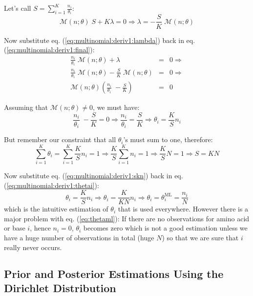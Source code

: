 Let's call $S = \sum_{i=1}^K \frac{n_i}{\theta_i}$:
\begin{equation}
\mathcal{M}(n ; \theta) \; S + K \lambda = 0 
\Rightarrow
\lambda = - \frac{S}{K} \; \mathcal{M}(n ; \theta)
\label{eq:multinomial:deriv1:lambda}
\end{equation}

Now substitute eq. (\ref{eq:multinomial:deriv1:lambda}) back in eq. (\ref{eq:multinomial:deriv1:final}):
\begin{eqnarray}
\frac{n_i}{\theta_i} \; \mathcal{M}(n ; \theta) + \lambda & = & 0
\Rightarrow \\
\frac{n_i}{\theta_i} \; \mathcal{M}(n ; \theta)
- \frac{S}{K} \; \mathcal{M}(n ; \theta)
& = & 0
\Rightarrow \\
\mathcal{M}(n ; \theta) \left(
\frac{n_i}{\theta_i} \; 
- \frac{S}{K} \right)
& = & 0
\label{eq:multinomial:deriv1:backtoi}
\end{eqnarray}

Assuming that $\mathcal{M}(n ; \theta) \ne 0$, we must have:
\begin{equation}
\frac{n_i}{\theta_i} \; - \frac{S}{K} = 0
\Rightarrow
\frac{n_i}{\theta_i} = \frac{S}{K}
\Rightarrow
\theta_i = \frac{K}{S} n_i
\label{eq:multinomial:deriv1:thetai}
\end{equation}

But remember our constraint that all $\theta_i$'s must sum to one, therefore:
\begin{equation}
\sum_{i=1}^K \theta_i = \sum_{i=1}^K \frac{K}{S} n_i = 1
\Rightarrow
\frac{K}{S} \sum_{i=1}^K n_i = 1
\Rightarrow
\frac{K}{S} N = 1
\Rightarrow
S = K N
\label{eq:multinomial:deriv1:skn}
\end{equation}

Now substitute eq. (\ref{eq:multinomial:deriv1:skn}) back in eq. (\ref{eq:multinomial:deriv1:thetai}):
\begin{equation}
\theta_i = \frac{K}{S} n_i
\Rightarrow
\theta_i = \frac{K}{K N} n_i
\Rightarrow
\theta_i = \boxed{\theta_i^{\text{ML}} = \frac{n_i}{N}}
\label{eq:thetaml}
\end{equation}
which is the intuitive estimation of $\theta_i$ that is used everywhere. However there is a major problem with eq. (\ref{eq:thetaml}): If there are no observations for amino acid or base $i$, hence $n_i=0$, $\theta_i$ becomes zero which is not a good estimation unless we have a huge number of observations in total (huge $N$) so that we are sure that $i$ really never occurs.

\subsection{Prior and Posterior Estimations Using the Dirichlet Distribution}

